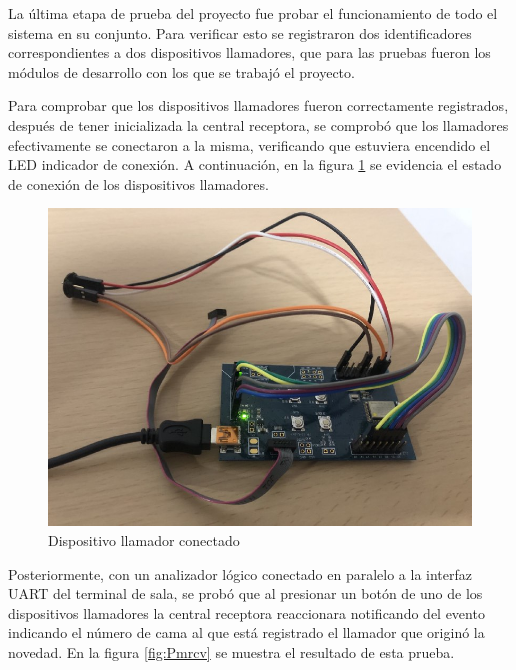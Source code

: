 La última etapa de prueba del proyecto fue probar el funcionamiento de todo el sistema en su conjunto. Para verificar esto se registraron dos identificadores correspondientes a dos dispositivos llamadores, que para las pruebas fueron los módulos de desarrollo con los que se trabajó el proyecto.

Para comprobar que los dispositivos llamadores fueron correctamente registrados, después de tener inicializada la central receptora, se comprobó que los llamadores efectivamente se conectaron a la misma, verificando que estuviera encendido el LED indicador de conexión. A continuación, en la figura \ref{fig:Pmcon} se evidencia el estado de conexión de los dispositivos llamadores.

\begin{figure}[htpb]
	\centering
	\includegraphics[scale=0.45]{./Figures/callcon.jpeg}	
	\caption{Dispositivo llamador conectado}
	\label{fig:Pmcon}
\end{figure}

Posteriormente, con un analizador lógico conectado en paralelo a la interfaz UART del terminal de sala, se probó que al presionar un botón de uno de los dispositivos llamadores la central receptora reaccionara notificando del evento indicando el número de cama al que está registrado el llamador que originó la novedad. En la figura \ref{fig:Pmrcv} se muestra el resultado de esta prueba.

